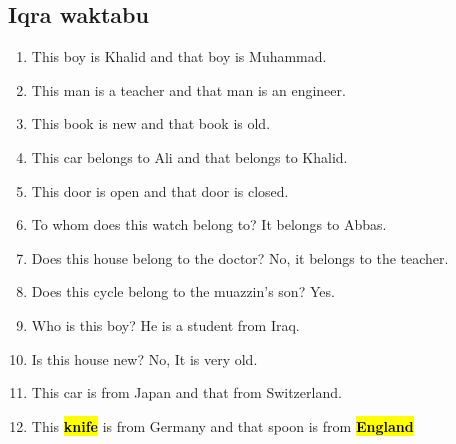 \subsection{Iqra waktabu}
\begin{enumerate}
    \item This boy is Khalid and that boy is Muhammad. \\[0.1in] \answerline
    \item This man is a teacher and that man is an engineer. \\[0.1in] \answerline
    \item This book is new and that book is old. \\[0.1in] \answerline
    \item This car belongs to Ali and that belongs to Khalid.\\[0.1in] \answerline
    \item This door is open and that door is closed. \\[0.1in] \answerline
    \item To whom does this watch belong to? It belongs to Abbas. \\[0.1in] \answerline
    \item Does this house belong to the doctor? No, it belongs to the teacher. \\[0.1in] \answerline
    \item Does this cycle belong to the muazzin's son? Yes.  \\[0.1in] \answerline
    \item Who is this boy? He is a student from Iraq. \\[0.1in] \answerline
    \item Is this house new? No, It is very old.  \\[0.1in] \answerline
    \item This car is from Japan and that from Switzerland.  \\[0.1in] \answerline
    \item This \hl{\textbf{knife}} is from Germany and that spoon is from \hl{\textbf{England}} \\[0.1in] \answerline
\end{enumerate}


